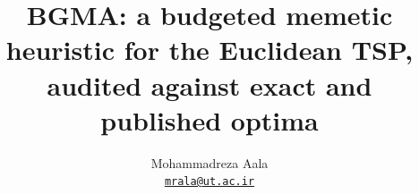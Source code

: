 \documentclass[11pt]{article}
\title{BGMA: a budgeted memetic heuristic for the Euclidean TSP,\\
audited against exact and published optima}
\author{Mohammadreza Aala\\
\small\href{mailto:mrala@ut.ac.ir}{\texttt{mrala@ut.ac.ir}}}
\date{\RepoDate}
\begin{document}
\maketitle

\begin{abstract}

\end{abstract}






\appendix

\end{document}
